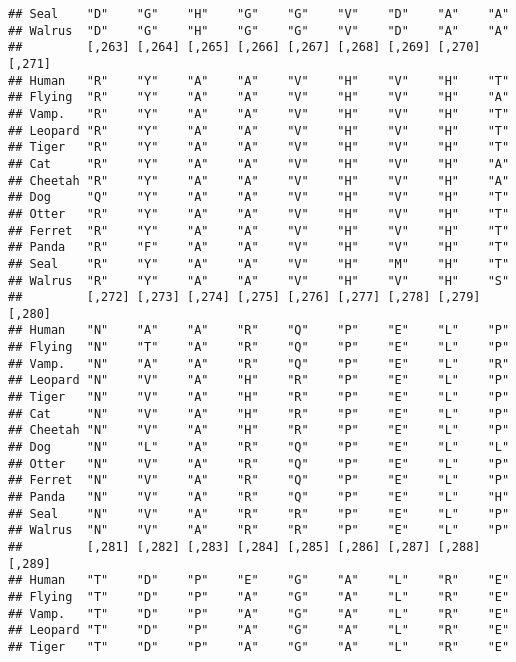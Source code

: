 \documentclass[]{article}
\begin{document}
\begin{verbatim}
## Seal    "D"    "G"    "H"    "G"    "G"    "V"    "D"    "A"    "A"   
## Walrus  "D"    "G"    "H"    "G"    "G"    "V"    "D"    "A"    "A"   
##         [,263] [,264] [,265] [,266] [,267] [,268] [,269] [,270] [,271]
## Human   "R"    "Y"    "A"    "A"    "V"    "H"    "V"    "H"    "T"   
## Flying  "R"    "Y"    "A"    "A"    "V"    "H"    "V"    "H"    "A"   
## Vamp.   "R"    "Y"    "A"    "A"    "V"    "H"    "V"    "H"    "T"   
## Leopard "R"    "Y"    "A"    "A"    "V"    "H"    "V"    "H"    "T"   
## Tiger   "R"    "Y"    "A"    "A"    "V"    "H"    "V"    "H"    "T"   
## Cat     "R"    "Y"    "A"    "A"    "V"    "H"    "V"    "H"    "A"   
## Cheetah "R"    "Y"    "A"    "A"    "V"    "H"    "V"    "H"    "A"   
## Dog     "Q"    "Y"    "A"    "A"    "V"    "H"    "V"    "H"    "T"   
## Otter   "R"    "Y"    "A"    "A"    "V"    "H"    "V"    "H"    "T"   
## Ferret  "R"    "Y"    "A"    "A"    "V"    "H"    "V"    "H"    "T"   
## Panda   "R"    "F"    "A"    "A"    "V"    "H"    "V"    "H"    "T"   
## Seal    "R"    "Y"    "A"    "A"    "V"    "H"    "M"    "H"    "T"   
## Walrus  "R"    "Y"    "A"    "A"    "V"    "H"    "V"    "H"    "S"   
##         [,272] [,273] [,274] [,275] [,276] [,277] [,278] [,279] [,280]
## Human   "N"    "A"    "A"    "R"    "Q"    "P"    "E"    "L"    "P"   
## Flying  "N"    "T"    "A"    "R"    "Q"    "P"    "E"    "L"    "P"   
## Vamp.   "N"    "A"    "A"    "R"    "Q"    "P"    "E"    "L"    "R"   
## Leopard "N"    "V"    "A"    "H"    "R"    "P"    "E"    "L"    "P"   
## Tiger   "N"    "V"    "A"    "H"    "R"    "P"    "E"    "L"    "P"   
## Cat     "N"    "V"    "A"    "H"    "R"    "P"    "E"    "L"    "P"   
## Cheetah "N"    "V"    "A"    "H"    "R"    "P"    "E"    "L"    "P"   
## Dog     "N"    "L"    "A"    "R"    "Q"    "P"    "E"    "L"    "L"   
## Otter   "N"    "V"    "A"    "R"    "Q"    "P"    "E"    "L"    "P"   
## Ferret  "N"    "V"    "A"    "R"    "Q"    "P"    "E"    "L"    "P"   
## Panda   "N"    "V"    "A"    "R"    "Q"    "P"    "E"    "L"    "H"   
## Seal    "N"    "V"    "A"    "R"    "R"    "P"    "E"    "L"    "P"   
## Walrus  "N"    "V"    "A"    "R"    "R"    "P"    "E"    "L"    "P"   
##         [,281] [,282] [,283] [,284] [,285] [,286] [,287] [,288] [,289]
## Human   "T"    "D"    "P"    "E"    "G"    "A"    "L"    "R"    "E"   
## Flying  "T"    "D"    "P"    "A"    "G"    "A"    "L"    "R"    "E"   
## Vamp.   "T"    "D"    "P"    "A"    "G"    "A"    "L"    "R"    "E"   
## Leopard "T"    "D"    "P"    "A"    "G"    "A"    "L"    "R"    "E"   
## Tiger   "T"    "D"    "P"    "A"    "G"    "A"    "L"    "R"    "E"   

\end{verbatim}
\end{document}
